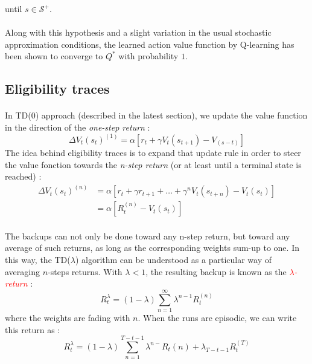 \documentclass[a4paper]{report}
\begin{document}
{{{{\begin{algorithm}[H]
							\Indm \Indm 
						until $s\in\mathcal{S}^+$.
						\Indm \Indm 
						\end{algorithm}
					}
				
				\paragraph{} Along with this hypothesis and a slight variation in the usual stochastic approximation conditions, the learned action value function by Q-learning has been shown to converge to $Q^*$ with probability $1$. 
			}
			\subsection{Eligibility traces}
			{
				\paragraph{} In TD(0) approach (described in the latest section), we update the value function in the direction of the \emph{one-step return} : 
				\begin{equation}
					\Delta V_t(s_t)^{(1)} = \alpha \left[ r_t + \gamma V_t(s_{t+1}) - V_(s-t)\right]
				\end{equation}
				The idea behind eligibility traces is to expand that update rule in order to steer the value fonction towards the \emph{n-step return} (or at least until a terminal state is reached) :
				\begin{equation}
					\begin{aligned}
					\Delta V_t(s_t) ^{(n)} &= \alpha \left[ r_t + \gamma r_{t+1} + \hdots + \gamma^{n} V_t(s_{t+n})-V_t(s_t)\right]	\\
									&= \alpha \left[R_t^{(n)} - V_t(s_t)\right]
					\end{aligned}
				\end{equation}
				
				\paragraph{} The backups can not only be done toward any n-step return, but toward any average of such returns, as long as the corresponding weights sum-up to one. In this way, the TD($\lambda$) algorithm can be understood as a particular way of averaging $n$-steps returns. With $\lambda<1$, the resulting backup is known as the \textcolor{red}{\emph{$\lambda$-return}} : 
				\begin{equation}
					R_t^\lambda = (1-\lambda) \sum_{n=1}^\infty \lambda^{n-1}R_t^{(n)}
				\end{equation}
				where the weights are fading with $n$. When the runs are episodic, we can write this return as : 
				\begin{equation}
					R_t^\lambda = (1-\lambda)\sum_{n=1}^{T-t-1} \lambda^{n-}R_t{(n)} + \lambda_{T-t-1}R_t^{(T)}
				\end{equation}
				
}}}
\end{document}
